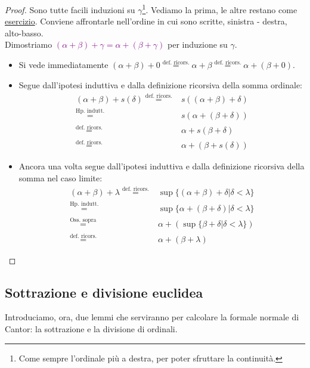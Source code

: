 \begin{proof}
	Sono tutte facili induzioni su $\gamma$\footnote{Come sempre l'ordinale pi\`u a destra, per poter sfruttare la continuit\`a.}. Vediamo la prima, le altre restano come \underline{esercizio}. Conviene affrontarle nell'ordine in cui sono scritte, sinistra - destra, alto-basso.\\
	Dimostriamo \textcolor{purple}{$(\alpha + \beta) + \gamma = \alpha + (\beta + \gamma)$} per induzione su $\gamma$.
	\begin{itemize}
		\item[$\boxed{\text{caso $\gamma = 0$}}$] Si vede immediatamente $(\alpha + \beta) + 0 \overset{\text{def. ricors.}}{=} \alpha + \beta \overset{\text{def. ricors.}}{=} \alpha + (\beta + 0)$.
		\item[$\boxed{\text{caso $\gamma = s(\delta)$}}$] Segue dall'ipotesi induttiva e dalla definizione ricorsiva della somma ordinale:
		\[\begin{split}
			(\alpha + \beta) + s(\delta) \overset{\text{def. ricors.}}{=}& s((\alpha + \beta) + \delta) \\
										 \overset{\text{Hp. indutt.}}{=}& s(\alpha + (\beta + \delta)) \\
										 \overset{\text{def. ricors.}}{=}& \alpha + s(\beta + \delta) \\
										 \overset{\text{def. ricors.}}{=}& \alpha + (\beta + s(\delta))
		\end{split}
			\]
		\item[$\boxed{\text{caso $\gamma = \lambda$ limite}}$] Ancora una volta segue dall'ipotesi induttiva e dalla definizione ricorsiva della somma nel caso limite:
		\[ \begin{split}
			(\alpha + \beta) + \lambda \overset{\text{def. ricors.}}{=} & \sup\{(\alpha + \beta) + \delta | \delta < \lambda\} \\
									   \overset{\text{Hp. indutt.}}{=}  & \sup\{\alpha + (\beta + \delta) | \delta < \lambda\} \\
									   \overset{\text{Oss. sopra}}{=}   &  \alpha + (\sup\{\beta + \delta | \delta < \lambda\}) \\
									   \overset{\text{def. ricors.}}{=} & \alpha + (\beta + \lambda)
			\end{split}
			\]
	\end{itemize}	
\end{proof}

\pagebreak

\subsection{Sottrazione e divisione euclidea}
Introduciamo, ora, due lemmi che serviranno per calcolare la formale normale di Cantor: la sottrazione e la divisione di ordinali.

